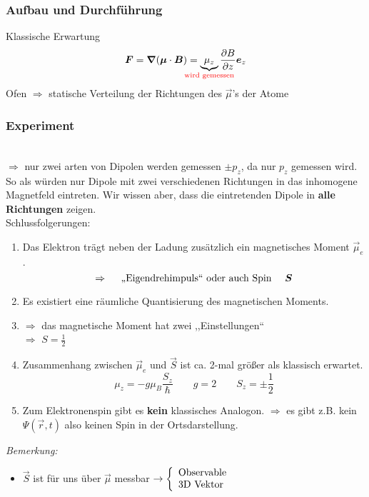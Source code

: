 \subsubsection{Aufbau und Durchführung}

Klassische Erwartung %
$$\vec{F} = \vec{\nabla}(\vec{\mu} \cdot \vec{B}) = \underbrace{\mu_z}_{\mathclap{\color{red}\tx{wird gemessen}}} \prt{B}{z} \vec{e}_z$$
Ofen $\Rightarrow$ statische Verteilung der Richtungen des $\vec{\mu}$'s der Atome

\subsubsection{Experiment}

\\[10pt]
$ \Rightarrow $ nur zwei arten von Dipolen werden gemessen $ \pm p_z $, da nur $ p_z $ gemessen wird.\\
So als würden nur Dipole mit zwei verschiedenen Richtungen in das inhomogene Magnetfeld eintreten. Wir wissen aber, dass die eintretenden Dipole in \textbf{alle Richtungen} zeigen.\\[10pt]
Schlussfolgerungen:
\begin{enumerate}[1)]
	\item Das Elektron trägt neben der Ladung zusätzlich ein magnetisches Moment $ \vec{\mu}_e $.
	\begin{equation*}
	\Rightarrow \quad \textrm{ ,,Eigendrehimpuls`` oder auch Spin } \quad \bm{S}
	\end{equation*}
	\item Es existiert eine räumliche Quantisierung des magnetischen Moments.
	\item $ \Rightarrow $ das magnetische Moment hat zwei ,,Einstellungen``\\
	$ \Rightarrow $ $ S = \frac{1}{2} $
	\item Zusammenhang zwischen $ \vec{\mu}_e $ und $ \vec{S} $ ist ca. 2-mal größer als klassisch erwartet.
	\begin{equation*}
	\mu_z = - g \mu_B \frac{S_z}{\hbar} \qquad g = 2 \qquad S_z = \pm \frac{1}{2}
	\end{equation*}
	\item Zum Elektronenspin gibt es \textbf{kein} klassisches Analogon.
	$ \Rightarrow $ es gibt z.B. kein $ \Psi(\vec{r},t) $ also keinen Spin in der Ortsdarstellung.
\end{enumerate}
\emph{Bemerkung:}
\begin{itemize}
	\item $ \vec{S} $ ist für uns über $ \vec{\mu} $ messbar $ \rightarrow  \left\{\begin{array}{l}
	\textrm{Observable} \\ \textrm{3D Vektor}
	\end{array}\right. $
\end{itemize}

